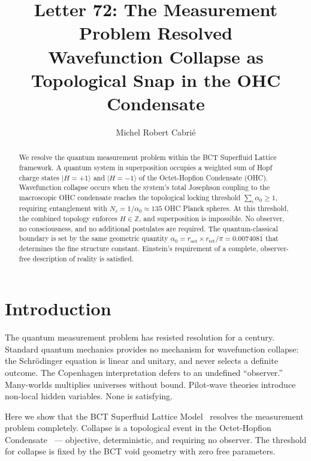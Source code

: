 \documentclass[aps,prl,twocolumn,superscriptaddress,showpacs]{revtex4-2}
\begin{document}
\title{Letter 72: The Measurement Problem Resolved\\
\large Wavefunction Collapse as Topological Snap in the OHC Condensate}

\author{Michel Robert Cabri\'{e}}

\begin{abstract}
We resolve the quantum measurement problem within the BCT Superfluid 
Lattice framework. A quantum system in superposition occupies a 
weighted sum of Hopf charge states $|H=+1\rangle$ and $|H=-1\rangle$ 
of the Octet-Hopfion Condensate (OHC). Wavefunction collapse occurs 
when the system's total Josephson coupling to the macroscopic OHC 
condensate reaches the topological locking threshold $\sum_i \alpha_0 \geq 1$,
requiring entanglement with $N_c = 1/\alpha_0 \approx 135$ OHC Planck 
spheres. At this threshold, the combined topology enforces $H \in \mathbb{Z}$,
and superposition is impossible. No observer, no consciousness, and no 
additional postulates are required. The quantum-classical boundary is 
set by the same geometric quantity $\alpha_0 = r_\mathrm{oct} \times 
r_\mathrm{tet}/\pi = 0.0074081$ that determines the fine structure constant.
Einstein's requirement of a complete, observer-free description of reality 
is satisfied.
\end{abstract}

\maketitle

\section{Introduction}

The quantum measurement problem has resisted resolution for a century.
Standard quantum mechanics provides no mechanism for wavefunction collapse:
the Schr\"{o}dinger equation is linear and unitary, and never selects a 
definite outcome. The Copenhagen interpretation defers to an undefined 
``observer.'' Many-worlds multiplies universes without bound. Pilot-wave 
theories introduce non-local hidden variables. None is satisfying.

Here we show that the BCT Superfluid Lattice Model~\cite{BCT_Monograph} 
resolves the measurement problem completely. Collapse is a topological 
event in the Octet-Hopfion Condensate~\cite{BCT_AppJH} --- objective, 
deterministic, and requiring no observer. The threshold for collapse is 
fixed by the BCT void geometry with zero free parameters.
\end{document}
